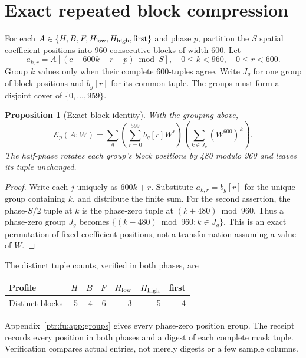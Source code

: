 \documentclass[11pt,letterpaper]{article}
\newtheorem{proposition}[theorem]{Proposition}
\theoremstyle{definition}\newtheorem{definition}[theorem]{Definition}
\theoremstyle{remark}\newtheorem{remark}[theorem]{Remark}
\newcommand{\op}[1]{\mathrm{#1}}
\newcommand{\E}{\mathcal E}\newcommand{\calQ}{\mathcal Q}\newcommand{\calL}{\mathcal L}
\begin{document}
\section{Exact repeated block compression}\label{ptr:fu:sec:blocks}
For each $A\in\{H,B,F,H_{\rm low},H_{\rm high},\op{first}\}$ and phase $p$, partition the $S$ spatial coefficient positions into 960 consecutive blocks of width 600. Let
\[
 a_{k,r}=A[(c-600k-r-p)\bmod S],\quad 0\le k<960,\quad0\le r<600.
\]
Group $k$ values only when their complete 600-tuples agree. Write $J_g$ for one group of block positions and $b_g[r]$ for its common tuple. The groups must form a disjoint cover of $\{0,\ldots,959\}$.

\begin{proposition}[Exact block identity]\label{ptr:fu:prop:block}
With the grouping above,
\begin{equation}\label{ptr:fu:eq:block}
 \E_p(A;W)=\sum_g\left(\sum_{r=0}^{599}b_g[r]W^r\right)
                         \left(\sum_{k\in J_g}(W^{600})^k\right).
\end{equation}
The half-phase rotates each group's block positions by 480 modulo 960 and leaves its tuple unchanged.
\end{proposition}
\begin{proof}
Write each $j$ uniquely as $600k+r$. Substitute $a_{k,r}=b_g[r]$ for the unique group containing $k$, and distribute the finite sum. For the second assertion, the phase-$S/2$ tuple at $k$ is the phase-zero tuple at $(k+480)\bmod960$. Thus a phase-zero group $J_g$ becomes $\{(k-480)\bmod960:k\in J_g\}$. This is an exact permutation of fixed coefficient positions, not a transformation assuming a value of $W$.
\end{proof}

The distinct tuple counts, verified in both phases, are
\begin{center}
\begin{tabular}{@{}lrrrrrr@{}}\toprule
Profile&$H$&$B$&$F$&$H_{\rm low}$&$H_{\rm high}$&first\\\midrule
Distinct blocks&5&4&6&3&5&4\\\bottomrule
\end{tabular}
\end{center}
Appendix~\ref{ptr:fu:app:groups} gives every phase-zero position group. The receipt records every position in both phases and a digest of each complete mask tuple. Verification compares actual entries, not merely digests or a few sample columns.
\end{document}
